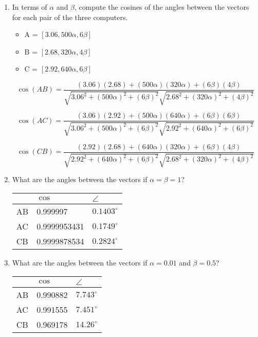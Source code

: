 \documentclass{article}
\begin{document}
\begin{enumerate}
\item{In terms of $\alpha$ and $\beta$, compute the cosines of the angles between the vectors for each pair of the three computers.
	
	\begin{itemize}
		\item A = $[3.06, 500\alpha, 6\beta]$
		\item B = $[2.68, 320\alpha, 4\beta]$
		\item C = $[2.92, 640\alpha, 6\beta]$
	\end{itemize}

	$$\cos(AB) = \frac{(3.06)(2.68) + (500\alpha)(320\alpha) + (6\beta)(4\beta)}{\sqrt{3.06^2+(500\alpha)^2+(6\beta)^2} \sqrt{2.68^2+(320\alpha)^2+(4\beta)^2}}$$
	
	$$\cos(AC) = \frac{(3.06)(2.92) + (500\alpha)(640\alpha) + (6\beta)(6\beta)}{\sqrt{3.06^2+(500\alpha)^2+(6\beta)^2} \sqrt{2.92^2+(640\alpha)^2+(6\beta)^2}}$$
	
	$$\cos(CB) = \frac{(2.92)(2.68) + (640\alpha)(320\alpha) + (6\beta)(4\beta)}{\sqrt{2.92^2+(640\alpha)^2+(6\beta)^2} \sqrt{2.68^2+(320\alpha)^2+(4\beta)^2}}$$
}

\item{What are the angles between the vectors if $\alpha = \beta = 1$?
	\begin{center}
		\begin{tabular}{ l | l | l }
			   & $\cos$       & $\angle$       \\ \hline
			AB & 0.999997     & $0.1403^\circ$ \\
			AC & 0.9999953431 & $0.1749^\circ$ \\
			CB & 0.9999878534 & $0.2824^\circ$
		\end{tabular}
	\end{center}
}

\item{What are the angles between the vectors if $\alpha = 0.01$ and $\beta = 0.5$?
	\begin{center}
		\begin{tabular}{ l | l | l }
			   & $\cos$   & $\angle$      \\ \hline
			AB & 0.990882 & $7.743^\circ$ \\
			AC & 0.991555 & $7.451^\circ$ \\
			CB & 0.969178 & $14.26^\circ$
		\end{tabular}
	\end{center}
}


\end{enumerate}
\end{document}
